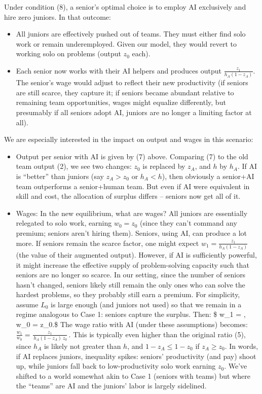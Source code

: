 \documentclass[12pt]{article}
\begin{document}
Under condition (8), a {senior's optimal choice} is to employ AI
exclusively and {hire zero juniors}. In that outcome:

\begin{itemize}
\tightlist
\item
  All juniors are effectively {pushed out} of teams. They must
  either find solo work or remain underemployed. Given our model, they
  would revert to working solo on problems (output \(z_0\) each).
\item
  Each senior now works with their AI helpers and produces output
  \(\frac{z_1}{h_A(1-z_A)}\). The {senior's wage} would adjust to
  reflect their new productivity (if seniors are still scarce, they
  capture it; if seniors became abundant relative to remaining team
  opportunities, wages might equalize differently, but presumably if all
  seniors adopt AI, juniors are no longer a limiting factor at all).
\end{itemize}

We are especially interested in the {impact on output and wages}
in this scenario:

\begin{itemize}
\tightlist
\item
  {Output per senior with AI} is given by (7) above. Comparing
  (7) to the old team output (2), we see two changes: \(z_0\) is
  replaced by \(z_A\), and \(h\) by \(h_A\). If AI is ``better'' than
  juniors (say \(z_A > z_0\) or \(h_A < h\)), then obviously a senior+AI
  team outperforms a senior+human team. But even if AI were equivalent
  in skill and cost, the {allocation of surplus} differs -- seniors
  now get {all} of it.
\item
  {Wages:} In the new equilibrium, what are wages? All juniors
  are essentially relegated to solo work, earning \(w_0 = z_0\) (since
  they can't command any premium; seniors aren't hiring them). Seniors,
  using AI, can produce a lot more. If seniors remain the scarce factor,
  one might expect \(w_1 = \frac{z_1}{h_A(1-z_A)}\) (the value of their
  augmented output). However, if AI is sufficiently powerful, it might
  increase the {effective supply of problem-solving capacity} such
  that seniors are no longer so scarce. In our setting, since the number
  of seniors hasn't changed, seniors likely still remain the only ones
  who can solve the hardest problems, so they probably still earn a
  premium. For simplicity, assume \(L_0\) is large enough (and juniors
  not used) so that we remain in a regime analogous to Case 1: seniors
  capture the surplus. Then: \$ w\_1 = ,
  \qquad w\_0 = z\_0.\$ The {wage ratio with AI} (under these
  assumptions) becomes:
  \(\frac{w_1}{w_0} = \frac{z_1}{\,h_A (1-z_A) \, z_0}\,.\) This is
  typically {even higher} than the original ratio (5), since
  \(h_A\) is likely not greater than \(h\), and \(1-z_A \le 1-z_0\) if
  \(z_A \ge z_0\). In words, if AI replaces juniors, {inequality
  spikes}: seniors' productivity (and pay) shoot up, while juniors fall
  back to low-productivity solo work earning \(z_0\). We've shifted to a
  world somewhat akin to Case 1 (seniors with teams) but where the
  ``teams'' are AI and the juniors' labor is largely sidelined.
\end{itemize}
\end{document}
